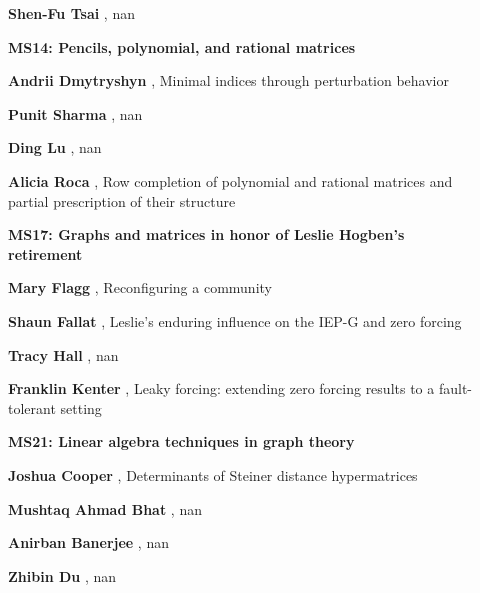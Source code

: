 \documentclass[ILAS2025-program.tex]{subfiles}
\begin{document}
\begin{description}
\begin{description}
        \item[] \textbf{Shen-Fu Tsai} , nan
        \end{description}
    \begin{description}
    \item[] {\color{mstitle}\textbf{MS14: Pencils, polynomial, and rational matrices}} 
    \item[] \textbf{Andrii Dmytryshyn} , Minimal indices through perturbation behavior
        \item[] \textbf{Punit Sharma} , nan
        \item[] \textbf{Ding Lu} , nan
        \item[] \textbf{Alicia Roca} , Row completion of polynomial and rational matrices and partial prescription of their  structure
        \end{description}
    \begin{description}
    \item[] {\color{mstitle}\textbf{MS17: Graphs and matrices in honor of Leslie Hogben's retirement}} 
    \item[] \textbf{Mary Flagg} , Reconfiguring a community
        \item[] \textbf{Shaun Fallat} , Leslie's enduring influence on the IEP-G and zero forcing
        \item[] \textbf{Tracy Hall} , nan
        \item[] \textbf{Franklin Kenter} , Leaky forcing: extending zero forcing results to a fault-tolerant setting
        \end{description}
    \begin{description}
    \item[] {\color{mstitle}\textbf{MS21: Linear algebra techniques in graph theory}} 
    \item[] \textbf{Joshua Cooper} , Determinants of Steiner distance hypermatrices
        \item[] \textbf{Mushtaq Ahmad Bhat} , nan
        \item[] \textbf{Anirban Banerjee} , nan
        \item[] \textbf{Zhibin Du} , nan

\end{description}
\end{description}
\end{document}
